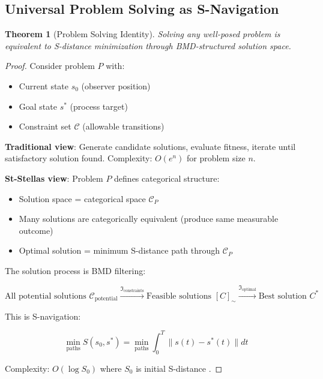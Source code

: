 \documentclass[12pt,a4paper]{article}
\newtheorem{theorem}{Theorem}[section]
\begin{document}
\subsection{Universal Problem Solving as S-Navigation}

\begin{theorem}[Problem Solving Identity]
\label{thm:problem_solving}
Solving any well-posed problem is equivalent to S-distance minimization through BMD-structured solution space.
\end{theorem}

\begin{proof}
Consider problem $P$ with:
\begin{itemize}
\item Current state $s_0$ (observer position)
\item Goal state $s^*$ (process target)
\item Constraint set $\mathcal{C}$ (allowable transitions)
\end{itemize}

\textbf{Traditional view}: Generate candidate solutions, evaluate fitness, iterate until satisfactory solution found. Complexity: $O(e^n)$ for problem size $n$.

\textbf{St-Stellas view}: Problem $P$ defines categorical structure:
\begin{itemize}
\item Solution space = categorical space $\mathcal{C}_P$
\item Many solutions are categorically equivalent (produce same measurable outcome)
\item Optimal solution = minimum S-distance path through $\mathcal{C}_P$
\end{itemize}

The solution process is BMD filtering:

\begin{equation}
\text{All potential solutions } \mathcal{C}_{\text{potential}} \xrightarrow{\Im_{\text{constraints}}} \text{Feasible solutions } [C]_{\sim} \xrightarrow{\Im_{\text{optimal}}} \text{Best solution } C^*
\end{equation}

This is S-navigation:

\begin{equation}
\min_{\text{paths}} S(s_0, s^*) = \min_{\text{paths}} \int_0^T \|s(t) - s^*(t)\| dt
\end{equation}

Complexity: $O(\log S_0)$ where $S_0$ is initial S-distance \cite{sachikonye2024sentropy}.


\end{proof}
\end{document}
